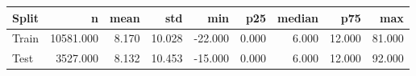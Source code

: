 \begin{tabular}{lrrrrrrrr}
\toprule
Split & n & mean & std & min & p25 & median & p75 & max \\
\midrule
Train & 10581.000 & 8.170 & 10.028 & -22.000 & 0.000 & 6.000 & 12.000 & 81.000 \\
Test & 3527.000 & 8.132 & 10.453 & -15.000 & 0.000 & 6.000 & 12.000 & 92.000 \\
\bottomrule
\end{tabular}
